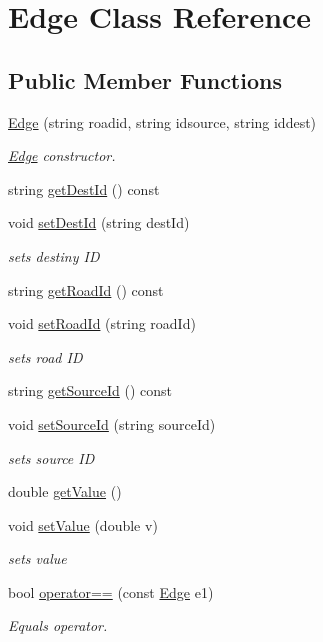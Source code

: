 \hypertarget{class_edge}{}\section{Edge Class Reference}
\label{class_edge}
\subsection*{Public Member Functions}
\begin{DoxyCompactItemize}
\item 
\mbox{\hyperlink{class_edge_a502613eadbfabefe00b0c3e1cfe33086}{Edge}} (string roadid, string idsource, string iddest)
\begin{DoxyCompactList}\small\item\em \mbox{\hyperlink{class_edge}{Edge}} constructor. \end{DoxyCompactList}\item 
string \mbox{\hyperlink{class_edge_a77bd2e1b64994a5711a2fb1e3ab0baec}{get\+Dest\+Id}} () const
\item 
void \mbox{\hyperlink{class_edge_a71831bfad8dfce53b42c0a9e042b75bb}{set\+Dest\+Id}} (string dest\+Id)
\begin{DoxyCompactList}\small\item\em sets destiny ID \end{DoxyCompactList}\item 
string \mbox{\hyperlink{class_edge_a94d394f7343d93f5ac4742b28d0bdd03}{get\+Road\+Id}} () const
\item 
void \mbox{\hyperlink{class_edge_ae809dcc7008e45ca467a1bb9c0a3502d}{set\+Road\+Id}} (string road\+Id)
\begin{DoxyCompactList}\small\item\em sets road ID \end{DoxyCompactList}\item 
string \mbox{\hyperlink{class_edge_a848848ceb4a39c87db8cb775a4bcd459}{get\+Source\+Id}} () const
\item 
void \mbox{\hyperlink{class_edge_a05e8ecd6061e3c204c78f926abea49df}{set\+Source\+Id}} (string source\+Id)
\begin{DoxyCompactList}\small\item\em sets source ID \end{DoxyCompactList}\item 
double \mbox{\hyperlink{class_edge_a327337dc8341c070cf85e4ba618879b8}{get\+Value}} ()
\item 
void \mbox{\hyperlink{class_edge_a4f34b96f079b6cf55741827fa4ce3a91}{set\+Value}} (double v)
\begin{DoxyCompactList}\small\item\em sets value \end{DoxyCompactList}\item 
bool \mbox{\hyperlink{class_edge_a66b472219149d9f1f9349ceb1c345525}{operator==}} (const \mbox{\hyperlink{class_edge}{Edge}} e1)
\begin{DoxyCompactList}\small\item\em Equals operator. \end{DoxyCompactList}\end{DoxyCompactItemize}

